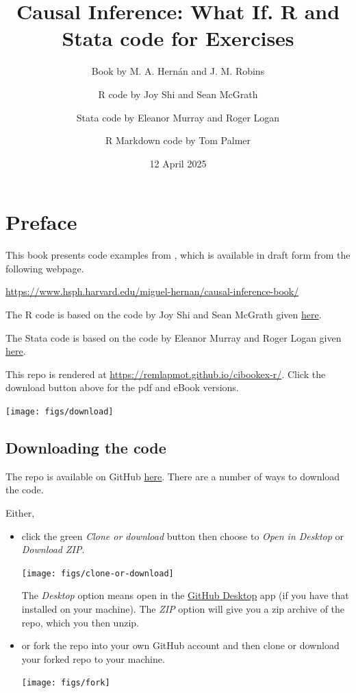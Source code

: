 \documentclass[
  10pt,
  a4paper,
]{book}
\title{Causal Inference: What If. R and Stata code for Exercises}
\author{Book by M. A. Hernán and J. M. Robins \and R code by Joy Shi and Sean McGrath \and Stata code by Eleanor Murray and Roger Logan \and R Markdown code by Tom Palmer}
\date{12 April 2025}
\begin{document}
\maketitle

\thispagestyle{empty}

{
\hypersetup{linkcolor=}
\setcounter{tocdepth}{1}
\tableofcontents
}
\chapter*{Preface}\label{preface}

This book presents code examples from \citet{ci-book}, which is available in draft form from the following webpage.

\url{https://www.hsph.harvard.edu/miguel-hernan/causal-inference-book/}

The R code is based on the code by Joy Shi and Sean McGrath given \href{https://cdn1.sph.harvard.edu/wp-content/uploads/sites/1268/1268/20/Rcode_CIpart2.zip}{here}.

The Stata code is based on the code by Eleanor Murray and Roger Logan given \href{https://cdn1.sph.harvard.edu/wp-content/uploads/sites/1268/2019/11/stata_part2.zip}{here}.

This repo is rendered at \url{https://remlapmot.github.io/cibookex-r/}. Click the download button above for the pdf and eBook versions.

\begin{center}\texttt{[image: figs/download]} \end{center}

\section{Downloading the code}\label{downloading-the-code}

The repo is available on GitHub \href{https://github.com/remlapmot/cibookex-r}{here}. There are a number of ways to download the code.

Either,

\begin{itemize}
\item
  click the green \emph{Clone or download} button then choose to \emph{Open in Desktop} or \emph{Download ZIP}.

  \begin{center}\texttt{[image: figs/clone-or-download]} \end{center}

  The \emph{Desktop} option means open in the \href{https://desktop.github.com/}{GitHub Desktop} app (if you have that installed on your machine). The \emph{ZIP} option will give you a zip archive of the repo, which you then unzip.
\item
  or fork the repo into your own GitHub account and then clone or download your forked repo to your machine.

  \begin{center}\texttt{[image: figs/fork]} \end{center}
\end{itemize}
\end{document}
